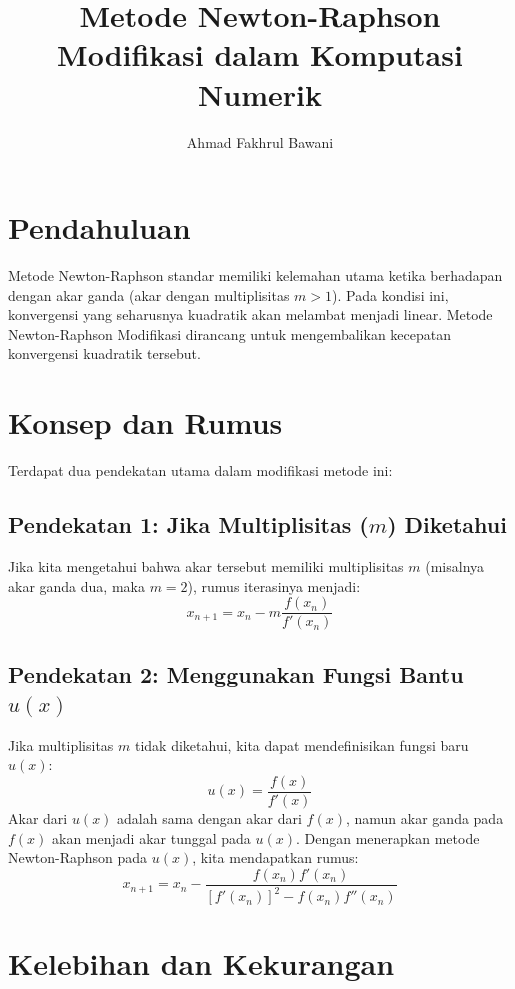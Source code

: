 \documentclass[12pt,a4paper]{article}
\title{Metode Newton-Raphson Modifikasi dalam Komputasi Numerik}
\author{Ahmad Fakhrul Bawani}
\date{}
\begin{document}
\maketitle

\section{Pendahuluan}
Metode Newton-Raphson standar memiliki kelemahan utama ketika berhadapan dengan akar ganda (akar dengan multiplisitas $m > 1$). Pada kondisi ini, konvergensi yang seharusnya kuadratik akan melambat menjadi linear. Metode Newton-Raphson Modifikasi dirancang untuk mengembalikan kecepatan konvergensi kuadratik tersebut.

\section{Konsep dan Rumus}
Terdapat dua pendekatan utama dalam modifikasi metode ini:

\subsection{Pendekatan 1: Jika Multiplisitas ($m$) Diketahui}
Jika kita mengetahui bahwa akar tersebut memiliki multiplisitas $m$ (misalnya akar ganda dua, maka $m=2$), rumus iterasinya menjadi:
\begin{equation}
x_{n+1} = x_n - m \frac{f(x_n)}{f'(x_n)}
\end{equation}

\subsection{Pendekatan 2: Menggunakan Fungsi Bantu $u(x)$}
Jika multiplisitas $m$ tidak diketahui, kita dapat mendefinisikan fungsi baru $u(x)$:
\begin{equation}
u(x) = \frac{f(x)}{f'(x)}
\end{equation}
Akar dari $u(x)$ adalah sama dengan akar dari $f(x)$, namun akar ganda pada $f(x)$ akan menjadi akar tunggal pada $u(x)$. Dengan menerapkan metode Newton-Raphson pada $u(x)$, kita mendapatkan rumus:
\begin{equation}
x_{n+1} = x_n - \frac{f(x_n)f'(x_n)}{[f'(x_n)]^2 - f(x_n)f''(x_n)}
\end{equation}

\section{Kelebihan dan Kekurangan}
\end{document}
